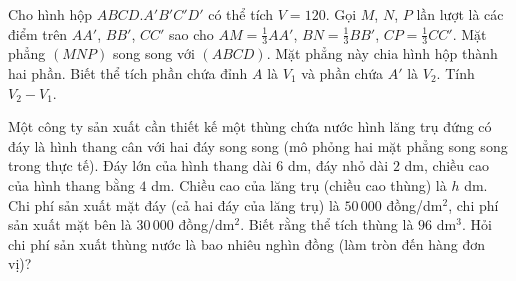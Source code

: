 \begin{bt}%
Cho hình hộp $ABCD.A'B'C'D'$ có thể tích $V=120$. Gọi $M$, $N$, $P$ lần lượt là các điểm trên $AA'$, $BB'$, $CC'$ sao cho $AM=\frac13 AA'$, $BN=\frac13 BB'$, $CP=\frac13 CC'$. Mặt phẳng $(MNP)$ song song với $(ABCD)$. Mặt phẳng này chia hình hộp thành hai phần. Biết thể tích phần chứa đỉnh $A$ là $V_1$ và phần chứa $A'$ là $V_2$. Tính $V_2-V_1$.

\end{bt}

\begin{bt}%
Một công ty sản xuất cần thiết kế một thùng chứa nước hình lăng trụ đứng có đáy là hình thang cân với hai đáy song song (mô phỏng hai mặt phẳng song song trong thực tế). Đáy lớn của hình thang dài $6$ dm, đáy nhỏ dài $2$ dm, chiều cao của hình thang bằng $4$ dm. Chiều cao của lăng trụ (chiều cao thùng) là $h$ dm. Chi phí sản xuất mặt đáy (cả hai đáy của lăng trụ) là $50\,000$ đồng/dm$^2$, chi phí sản xuất mặt bên là $30\,000$ đồng/dm$^2$. Biết rằng thể tích thùng là $96$ dm$^3$. Hỏi chi phí sản xuất thùng nước là bao nhiêu nghìn đồng (làm tròn đến hàng đơn vị)?

\end{bt}

